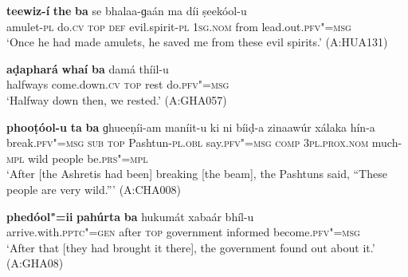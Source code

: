 \begin{exe}
\ex
\label{ex:14-115}
\gll \textbf{teewiz-í} \textbf{the} \textbf{ba} se bhalaa-ɡaán ma  díi ṣeekóol-u \\
amulet-\textsc{pl} do.\textsc{cv} \textsc{top} \textsc{def} evil.spirit-\textsc{pl} \textsc{1sg.nom} from lead.out.\textsc{pfv"=msg}{\protect\footnotemark} \\
\glt `Once he had made amulets, he saved me from these evil spirits.' (A:HUA131)

\ex
\label{ex:14-116}
\gll \textbf{aḍaphará} \textbf{whaí} \textbf{ba} damá thíil-u \\
halfways come.down.\textsc{cv} \textsc{top} rest do.\textsc{pfv"=msg } \\
\glt `Halfway down then, we rested.' (A:GHA057)

\ex
\label{ex:14-117}
\gll \textbf{phooṭóol-u} \textbf{ta} \textbf{ba} ɡhueeṇíi-am maníit-u ki ni bíiḍ-a zinaawúr
xálaka hín-a\\
break.\textsc{pfv"=msg} \textsc{sub} \textsc{top} Pashtun-\textsc{pl.obl} say.\textsc{pfv"=msg}  \textsc{comp} \textsc{3pl.prox.nom} much-\textsc{mpl} wild people be.\textsc{prs"=mpl}\\
\glt `After [the Ashretis had been] breaking [the beam], the Pashtuns said, ``These people are very wild.''' (A:CHA008)

\ex
\label{ex:14-118}
\gll \textbf{phedóol"=ii} \textbf{pahúrta} \textbf{ba} hukumát xabaár  bhíl-u\\
arrive.with.\textsc{pptc"=gen} after \textsc{top} government informed become.\textsc{pfv"=msg}\\
\glt `After that [they had brought it there], the government found out about it.' (A:GHA08)
\end{exe}

